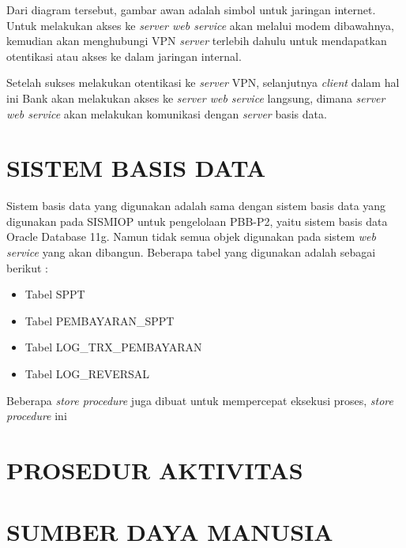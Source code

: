 \documentclass[pdftex,12pt, oneside]{article}
\begin{document}
Dari diagram tersebut, gambar awan adalah simbol untuk jaringan internet. Untuk melakukan akses ke \textit{server web service} akan melalui modem dibawahnya, kemudian akan menghubungi VPN \textit{server} terlebih dahulu untuk mendapatkan otentikasi atau akses ke dalam jaringan internal.

Setelah sukses melakukan otentikasi ke \textit{server} VPN, selanjutnya \textit{client} dalam hal ini Bank akan melakukan akses ke \textit{server web service} langsung, dimana \textit{server web service} akan melakukan komunikasi dengan \textit{server} basis data.

\section{SISTEM BASIS DATA}

Sistem basis data yang digunakan adalah sama dengan sistem basis data yang digunakan pada SISMIOP untuk pengelolaan PBB-P2, yaitu sistem basis data Oracle Database 11g. Namun tidak semua objek digunakan pada sistem \textit{web service} yang akan dibangun. Beberapa tabel yang digunakan adalah sebagai berikut :

\begin{itemize}
  \item Tabel SPPT
  \item Tabel PEMBAYARAN\_SPPT
  \item Tabel LOG\_TRX\_PEMBAYARAN
  \item Tabel LOG\_REVERSAL
\end{itemize}

Beberapa \textit{store procedure} juga dibuat untuk mempercepat eksekusi proses, \textit{store procedure} ini 

\section{PROSEDUR AKTIVITAS}


\section{SUMBER DAYA MANUSIA}
\end{document}
